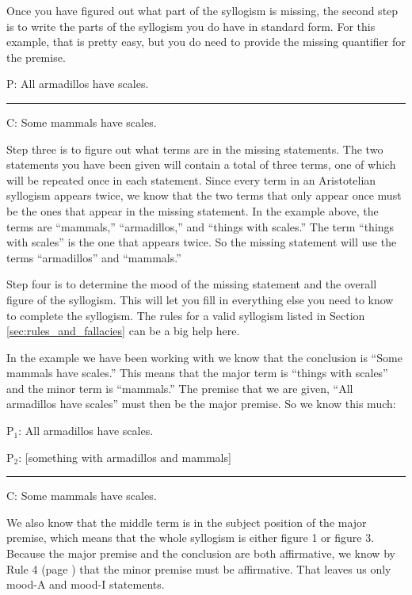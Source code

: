 {Once you have figured out what part of the syllogism is missing, the second step is to write the parts of the syllogism you do have in standard form. For this example, that is pretty easy, but you do need to provide the missing quantifier for the premise.

\begin{earg}
\item[P:] All armadillos have scales.
\vspace{-.5em}
\item [] \rule{0.3\linewidth}{.5pt} 
\item[C:] Some mammals have scales. 
\end{earg}

 Step three is to figure out what terms are in the missing statements. The two statements you have been given will contain a total of three terms, one of which will be repeated once in each statement. Since every term in an Aristotelian syllogism appears twice, we know that the two terms that only appear once must be the ones that appear in the missing statement. In the example above, the terms are ``mammals,'' ``armadillos,'' and ``things with scales.'' The term ``things with scales'' is the one that appears twice. So the missing statement will use the terms ``armadillos'' and ``mammals.''
   
Step four is to determine the mood of the missing statement and the overall figure of the syllogism. This will let you fill in everything else you need to know to complete the syllogism. The rules for a valid syllogism listed in Section \ref{sec:rules_and_fallacies} can be a big help here.

In the example we have been working with we know that the conclusion is ``Some mammals have scales.'' This means that the major term is ``things with scales'' and the minor term is ``mammals.'' The premise that we are given, ``All armadillos have scales'' must then be the major premise. So we know this much:

\begin{earg}
\item[P$_1$:] All armadillos have scales.
\item[P$_2$:] [something with armadillos and mammals]
\vspace{-.5em}
\item [] \rule{0.6\linewidth}{.5pt} 
\item[C:] Some mammals have scales. 
\end{earg}

We also know that the middle term is in the subject position of the major premise, which means that the whole syllogism is either figure 1 or figure 3. Because the major premise and the conclusion are both affirmative, we know by Rule 4 (page \pageref{rule4}) that the minor premise must be affirmative. That leaves us only mood-A and mood-I statements. \label{rule_use}

}
